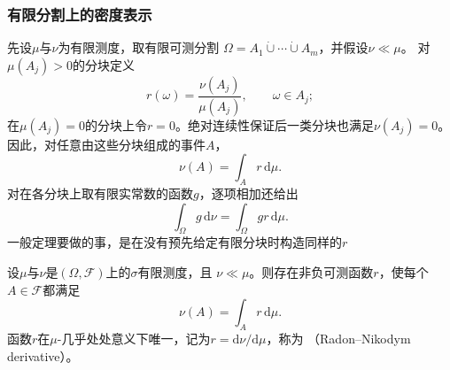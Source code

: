 \subsubsection{有限分割上的密度表示}

先设\(\mu\)与\(\nu\)为有限测度，取有限可测分割
\(\Omega=A_1\mathbin{\dot\cup}\cdots\mathbin{\dot\cup}A_m\)，并假设\(\nu\ll\mu\)。
对\(\mu(A_j)>0\)的分块定义
\[ r(\omega)=\frac{\nu(A_j)}{\mu(A_j)},
  \qquad \omega\in A_j; \]
在\(\mu(A_j)=0\)的分块上令\(r=0\)。绝对连续性保证后一类分块也满足\(\nu(A_j)=0\)。因此，对任意由这些分块组成的事件\(A\)，
\[ \nu(A)=\int_A r\,\mathrm{d}\mu. \]
对在各分块上取有限实常数的函数\(g\)，逐项相加还给出
\begin{equation}
  \int_{\Omega}g\,\mathrm{d}\nu
  =
  \int_{\Omega}gr\,\mathrm{d}\mu.
  \label{eq:probability-finite-change-measure}
\end{equation}
一般定理要做的事，是在没有预先给定有限分块时构造同样的\(r\)

\begin{theorem}
\label{thm:probability-radon-nikodym}
设\(\mu\)与\(\nu\)是\((\Omega,\mathcal{F})\)上的\(\sigma\)有限测度，且
\(\nu\ll\mu\)。则存在非负可测函数\(r\)，使每个\(A\in\mathcal{F}\)都满足
\begin{equation}
  \nu(A)=\int_A r\,\mathrm{d}\mu.
  \label{eq:probability-rn-representation}
\end{equation}
函数\(r\)在\(\mu\)-几乎处处意义下唯一，记为\(r=\mathrm{d}\nu/\mathrm{d}\mu\)，称为
（Radon--Nikodym derivative）。
\end{theorem}

